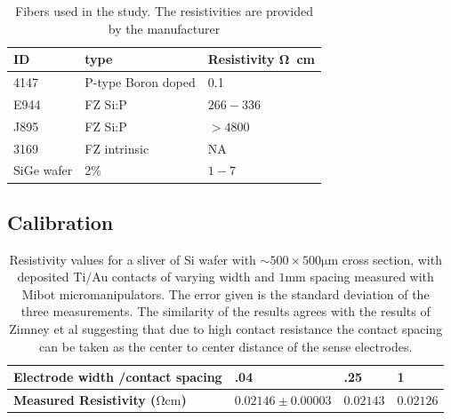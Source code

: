  \begin{table}[h]
\begin{center}
    \begin{tabular}{|l|l|l|  }
    \hline
    \textbf{ID} & \textbf{type} & \textbf{Resistivity \si{\ohm \cm}}   \\ \hline
    4147 & P-type Boron doped & 0.1 \\
    E944 & FZ Si:P &$266-336$\\
    J895 & FZ Si:P & $> 4800$    \\
    3169 & FZ intrinsic & NA\\
    SiGe wafer & 2\%&$1-7$\\
     \hline
    \end{tabular}
\end{center}
\caption{Fibers used in the study. The resistivities are provided by the manufacturer }
\label{resistivity}
\end{table}

\subsection{Calibration}

\begin{table}[!htb]
\begin{center}
\begin{tabular}{ | l | l | l | l |}
\hline
\textbf{Electrode width /contact spacing}&\textbf{.04} & \textbf{.25} & \textbf{1} \\ \hline
\textbf{Measured Resistivity ($\si{\ohm \cm}$)} & $ 0.02146 \pm 0.00003$& $0.02143$&$0.02126 $\\\hline

\end{tabular}
\end{center}
\caption{Resistivity values for a sliver of Si wafer with $\sim 500 \times 500 \si{\micro \meter}$ cross section, with deposited Ti/Au contacts of varying width and $1 \si{\mm}$ spacing measured with Mibot micromanipulators. The error given is the standard deviation of the three measurements. The similarity of the results agrees with the results of Zimney et al \cite{Zimney2007CorrectionStudy} suggesting that due to high contact resistance the contact spacing can be taken as the center to center distance of the sense electrodes.}
\label{Tabcorrection}
\end{table}

